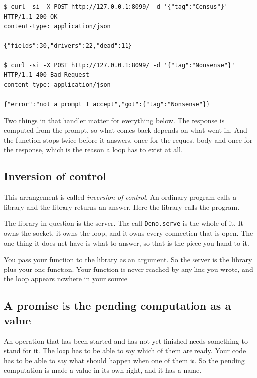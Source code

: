 \documentclass[11pt,a4paper]{article}
\begin{document}
\begin{lstlisting}[language=SH]
$ curl -si -X POST http://127.0.0.1:8099/ -d '{"tag":"Census"}'
HTTP/1.1 200 OK
content-type: application/json

{"fields":30,"drivers":22,"dead":11}

$ curl -si -X POST http://127.0.0.1:8099/ -d '{"tag":"Nonsense"}'
HTTP/1.1 400 Bad Request
content-type: application/json

{"error":"not a prompt I accept","got":{"tag":"Nonsense"}}
\end{lstlisting}

Two things in that handler matter for everything below. The response is computed from the prompt, so
what comes back depends on what went in. And the function stops twice before it answers, once for
the request body and once for the response, which is the reason a loop has to exist at all.

\newpage

\subsection{Inversion of control}

\begin{sectionbox}
This arrangement is called \emph{inversion of control}. An ordinary program calls a library and the
library returns an answer. Here the library calls the program.

The library in question is the server. The call \texttt{Deno.serve} is the whole of it. It owns the
socket, it owns the loop, and it owns every connection that is open. The one thing it does not have
is what to answer, so that is the piece you hand to it.

You pass your function to the library as an argument. So the server is the library plus your one
function. Your function is never reached by any line you wrote, and the loop appears nowhere in
your source.
\end{sectionbox}

\subsection{A promise is the pending computation as a value}

An operation that has been started and has not yet finished needs something to stand for it. The
loop has to be able to say which of them are ready. Your code has to be able to say what should
happen when one of them is. So the pending computation is made a value in its own right, and it has
a name.
\end{document}
